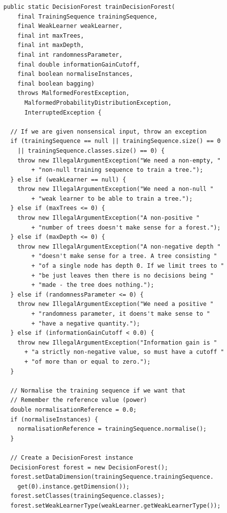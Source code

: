 \documentclass[12pt,twoside,notitlepage]{report}
\begin{document}
    \begin{lstlisting}[caption={The implementation code for training a decision forest.}, label={lst:actualTrainForest}]
public static DecisionForest trainDecisionForest(
    final TrainingSequence trainingSequence, 
    final WeakLearner weakLearner, 
    final int maxTrees, 
    final int maxDepth, 
    final int randomnessParameter,
    final double informationGainCutoff, 
    final boolean normaliseInstances, 
    final boolean bagging) 
    throws MalformedForestException, 
      MalformedProbabilityDistributionException, 
      InterruptedException {
  
  // If we are given nonsensical input, throw an exception
  if (trainingSequence == null || trainingSequence.size() == 0 
    || trainingSequence.classes.size() == 0) {
    throw new IllegalArgumentException("We need a non-empty, "
        + "non-null training sequence to train a tree.");
  } else if (weakLearner == null) {
    throw new IllegalArgumentException("We need a non-null "
        + "weak learner to be able to train a tree.");
  } else if (maxTrees <= 0) {
    throw new IllegalArgumentException("A non-positive "
        + "number of trees doesn't make sense for a forest.");
  } else if (maxDepth <= 0) {
    throw new IllegalArgumentException("A non-negative depth "
        + "doesn't make sense for a tree. A tree consisting "
        + "of a single node has depth 0. If we limit trees to "
        + "be just leaves then there is no decisions being " 
        + "made - the tree does nothing.");
  } else if (randomnessParameter <= 0) {
    throw new IllegalArgumentException("We need a positive "
        + "randomness parameter, it doens't make sense to " 
        + "have a negative quantity.");
  } else if (informationGainCutoff < 0.0) {
    throw new IllegalArgumentException("Information gain is "
      + "a strictly non-negative value, so must have a cutoff "
      + "of more than or equal to zero.");
  }
  
  // Normalise the training sequence if we want that
  // Remember the reference value (power)
  double normalisationReference = 0.0;
  if (normaliseInstances) {
    normalisationReference = trainingSequence.normalise();
  }
  
  // Create a DecisionForest instance
  DecisionForest forest = new DecisionForest();
  forest.setDataDimension(trainingSequence.trainingSequence.
    get(0).instance.getDimension());
  forest.setClasses(trainingSequence.classes);
  forest.setWeakLearnerType(weakLearner.getWeakLearnerType());


\end{lstlisting}
\end{document}
